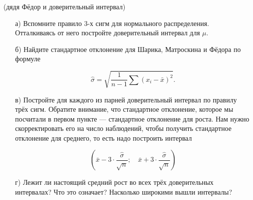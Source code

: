 \documentclass[12pt, a4paper, oneside]{article}
\begin{document}
\begin{problem}{(дядя Фёдор и доверительный интервал)}
\begin{enumerate}
	
	\item[а)] Вспомните правило $3$-х сигм для нормального распределения. Отталкиваясь от него постройте доверительный интервал для $\mu$. 
	
	\item[б)] Найдите стандартное отклонение для Шарика, Матроскина и Фёдора по формуле 
	
	\[\hat \sigma = \sqrt{ \frac{1}{n-1}  \sum (x_i - \bar x)^2}.\]
	
	\item[в)] Постройте для каждого из парней доверительный интервал по правилу трёх сигм. Обратите внимание, что стандартное отклонение, которое мы посчитали в первом пункте --- стандартное отклонение для роста. Нам нужно скорректировать его на число наблюдений, чтобы получить стандартное отклонение для среднего, то есть надо построить интервал
	
	\[ \left( \bar x - 3 \cdot \frac{\hat \sigma}{\sqrt{n}}; \quad \bar x + 3 \cdot \frac{\hat \sigma}{\sqrt{n}} \right)\] 
	
	\item[г)] Лежит ли настоящий средний рост во всех трёх доверительных интервалах? Что это означает? Насколько широкими вышли интервалы? 
\end{enumerate}
\end{problem}
\end{document}
